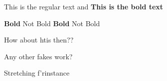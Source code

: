 \documentclass[a5paper, 12pt]{article}
\begin{document}
This is the regular text and \textbf{This is the bold text}

\textbf{Bold} Not Bold \textbf{Bold} Not Bold

How about htis then??

Any other fakes work?

Stretching f'rinstance
\end{document}
